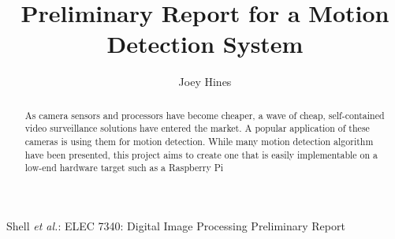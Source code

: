 \documentclass[journal]{IEEEtran}
\begin{document}
%
    \title{Preliminary Report for a Motion Detection System}
%
%
%

    \author{Joey Hines}

    {Shell \MakeLowercase{\textit{et al.}}: ELEC 7340: Digital Image Processing Preliminary Report}


    \maketitle

    \begin{abstract}
        As camera sensors and processors have become cheaper, a wave of cheap, self-contained video surveillance solutions have entered
        the market. A popular application of these cameras is using them for motion detection. While many motion detection algorithm have
        been presented, this project aims to create one that is easily implementable on a low-end hardware target such as a Raspberry Pi
    \end{abstract}


%
    \IEEEpeerreviewmaketitle
\end{document}
